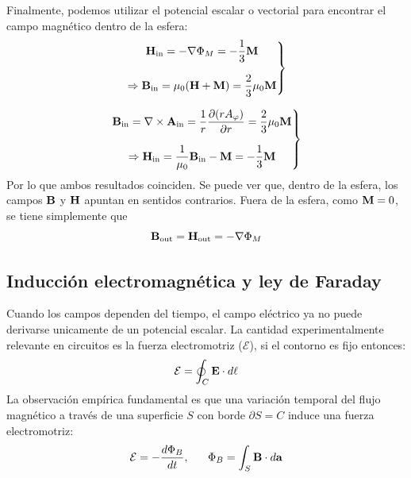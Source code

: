 \documentclass[]{article}
\numberwithin{equation}{section}
\begin{document}
Finalmente, podemos utilizar el potencial escalar o vectorial para encontrar el campo magnético dentro de la esfera:
\begin{equation}
	\left.\begin{matrix}
		\n{H}_{\mathrm{in}} = -\gr\Phi_{M} = - \dfrac{1}{3} \n{M} \vspace{4mm}\\
		\Rightarrow \n{B}_{\mathrm{in}} = \uo (\n{H} + \n{M}) = \dfrac{2}{3} \uo \n{M}
	\end{matrix}\right\rbrace
\end{equation}

\begin{equation}
	\left.\begin{matrix}
		\n{B}_{\mathrm{in}} = \ro\n{A}_{\mathrm{in}} = \dfrac{1}{r}\pd{(r A_{\varphi})}{r} = \dfrac{2}{3} \uo \n{M}\vspace{4mm}\\
		\Rightarrow \n{H}_{\mathrm{in}} = \dfrac{1}{\uo} \n{B}_{\mathrm{in}} - \n{M} = - \dfrac{1}{3} \n{M}
	\end{matrix}\right\rbrace
\end{equation}
Por lo que ambos resultados coinciden. Se puede ver que, dentro de la esfera, los campos \(\mathbf{B}\) y \(\mathbf{H}\) apuntan en sentidos contrarios. Fuera de la esfera, como \(\mathbf{M} = 0\), se tiene simplemente que
\begin{equation}
	\mathbf{B}_{\mathrm{out}} = \mathbf{H}_{\mathrm{out}} = -\nabla\Phi_{M}
\end{equation}

\subsection{Inducción electromagnética y ley de Faraday}
Cuando los campos dependen del tiempo, el campo eléctrico ya no puede derivarse unicamente de un potencial escalar. La cantidad experimentalmente relevante en circuitos es la fuerza electromotriz (\(\mathcal{E}\)), si el contorno es fijo entonces:
\begin{equation}
	\mathcal{E} = \oint_{C} \mathbf{E}\cdot d\mathbf{\ell}
\end{equation}
La observación empírica fundamental es que una variación temporal del flujo magnético a través de una superficie \(S\) con borde \(\partial S = C\) induce una fuerza electromotriz:
\begin{equation}
	\mathcal{E} = - \dfrac{d \Phi_{B}}{d t}, ~~~~~ \Phi_{B} = \int_{S} \mathbf{B}\cdot d\mathbf{a}
\end{equation}
\end{document}
